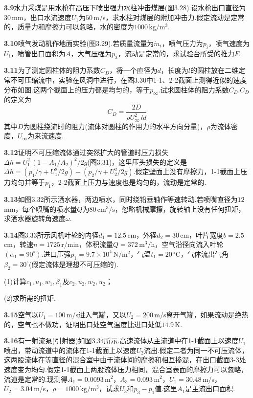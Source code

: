 \medskip
\noindent\textbf{3.9}\quad 水力采煤是用水枪在高压下喷出强力水柱冲击煤层(图3.28).设水枪出口直径为$30\,$mm，出口水流速度$U_1$为$50\,$m/s，求水柱对煤层的附加冲击力.假定流动是定常的，质量力和摩擦力可以忽略，水的密度为$1000\,\mathrm{kg/m^3}$.

\medskip
\noindent\textbf{3.10}\quad 喷气发动机作地面实验(图3.29).若质量流量为$\dot{m}_i$，喷气压力为$p_i$，喷气速度为$U_i$，喷管出口面积为$A$，大气压强为$p_{\mathrm{a}}$，流动是定常的，求试验台所受的推力$F$.

\medskip
\noindent\textbf{3.11}\quad 为了测定圆柱体的阻力系数$C_D$，将一个直径为$d$，长度为$l$的圆柱放在二维定常不可压缩流中，实验在风洞中进行，在图3.30中1-1、2-2截面上测得近似的速度分布如图.这两个截面上的压力都是均匀的，等于$p_\infty$.试求圆柱体的阻力系数$C_D$.$C_D$的定义为
\[
C_D=\frac{2D}{\rho U_\infty^{2}\,ld}
\]
其中$D$为圆柱绕流时的阻力(流体对圆柱的作用力的水平方向分量)，$\rho$为流体密度，$U_\infty$为来流速度.

\medskip
\noindent\textbf{3.12}\quad 证明不可压缩流体通过突然扩大的管道时压力损失$\Delta h=U_1^{2}\,(1-A_1/A_2)^{2}/2g$(图3.31)，这里压头损失的定义是$\Delta h=(p_1/\gamma+U_1^{2}/2g)-(p_2/\gamma+U_2^{2}/2g)$.假定壁面上没有摩擦力，1-1截面上压力均匀并等于$p_1$，2-2截面上压力与速度也是均匀的，流动是定常的.

\medskip
\noindent\textbf{3.13}\quad 如图3.32所示洒水器，两边喷水，同时绕铅垂轴作等速转动.若喷嘴直径为$12\,$mm，每个喷嘴的喷水量$Q$为$80\,\mathrm{cm^3/s}$，忽略机械摩擦，旋转轴上没有任何扭矩，求洒水器旋转角速度$\omega$.

\medskip
\noindent\textbf{3.14}\quad 图3.33所示风机叶轮的内径$d_1=12.5\,$cm，外径$d_2=30\,$cm，叶片宽度$b=2.5\,$cm，转速$n=1725\,$r/min，体积流量$Q=372\,\mathrm{m^3/h}$，空气沿径向流入叶轮$(\alpha_1=90^{\circ})$.进口压强$p_1=9.7\times 10^{4}\,\mathrm{N/m^2}$，气温$t_1=20\,^{\circ}$C，气体流出气角$\beta_2=30^{\circ}$(假定流体是理想不可压缩的).

(1)计算$c_1,u_1,w_1,\beta_1$及$c_2,u_2,w_2,\alpha_2$；

(2)求所需的扭矩.

\medskip
\noindent\textbf{3.15}\quad 空气以$U_1=100\,$m/s进入气罐，又以$U_2=200\,$m/s离开气罐，如果流动是绝热的，空气也不做功，证明出口处空气温度比进口处低$14.9\,$K.

\medskip
\noindent\textbf{3.16}\quad 有一射流泵(引射器)如图3.34所示.高速流体从主流道中在1-1截面上以速度$U_1$喷出，带动流道中的流体在1-1截面上以速度$U_2$流出.假定二者为同一不可压流体，这两股流体在等直径的混合室中由于流体间的摩擦和相互掺混，在出口截面3-3处速度变为均匀.假定1-1截面上两股流体压力相同，混合室表面的摩擦力可以忽略，流道是定常的.现测得$A_1=0.0093\,\mathrm{m^2}$，$A_3=0.093\,\mathrm{m^2}$，$U_1=30.48\,$m/s，$U_2=3.04\,$m/s，$\rho=1000\,\mathrm{kg/m^3}$，试求$U_3$和$p_3-p_1$值.这里$A_1$是主流出口面积.

